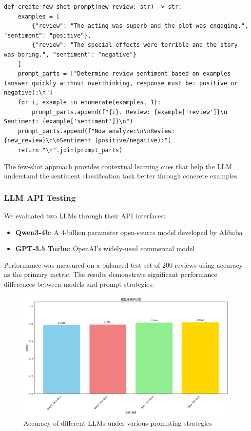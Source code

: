 \documentclass{article}
\begin{document}
\begin{lstlisting}[caption={Few-shot prompt design}]
def create_few_shot_prompt(new_review: str) -> str:
    examples = [
        {"review": "The acting was superb and the plot was engaging.", "sentiment": "positive"},
        {"review": "The special effects were terrible and the story was boring.", "sentiment": "negative"}
    ]
    prompt_parts = ["Determine review sentiment based on examples (answer quickly without overthinking, response must be: positive or negative):\n"]
    for i, example in enumerate(examples, 1):
        prompt_parts.append(f"{i}. Review: {example['review']}\n   Sentiment: {example['sentiment']}\n")
    prompt_parts.append(f"Now analyze:\n\nReview: {new_review}\n\nSentiment (positive/negative):")
    return "\n".join(prompt_parts)
\end{lstlisting}

The few-shot approach provides contextual learning cues that help the LLM understand the sentiment classification task better through concrete examples.

\subsubsection{LLM API Testing}
\label{sssec:llm_api}

We evaluated two LLMs through their API interfaces:
\begin{itemize}
    \item \textbf{Qwen3-4b}: A 4-billion parameter open-source model developed by Alibaba
    \item \textbf{GPT-3.5 Turbo}: OpenAI's widely-used commercial model
\end{itemize}

Performance was measured on a balanced test set of 200 reviews using accuracy as the primary metric. The results demonstrate significant performance differences between models and prompt strategies:

\begin{figure}[h]
    \centering
    \includegraphics[width=1\columnwidth]{pic/T2P2.c.acc.png}
    \caption{Accuracy of different LLMs under various prompting strategies}
    \label{fig:llm_accuracy}
\end{figure}
\end{document}
